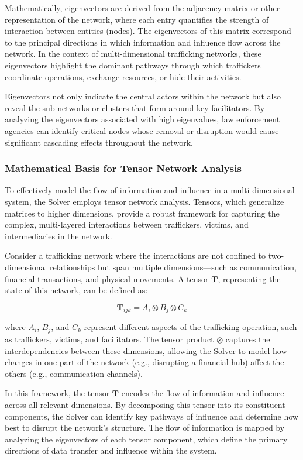 \documentclass[%
 preprint, linenumbers,
 amsmath,amssymb,
 aps, physrev,
]{revtex4-2}
\begin{document}
Mathematically, eigenvectors are derived from the adjacency matrix or other representation of the network, where each entry quantifies the strength of interaction between entities (nodes). The eigenvectors of this matrix correspond to the principal directions in which information and influence flow across the network. In the context of multi-dimensional trafficking networks, these eigenvectors highlight the dominant pathways through which traffickers coordinate operations, exchange resources, or hide their activities. 

Eigenvectors not only indicate the central actors within the network but also reveal the sub-networks or clusters that form around key facilitators. By analyzing the eigenvectors associated with high eigenvalues, law enforcement agencies can identify critical nodes whose removal or disruption would cause significant cascading effects throughout the network.

\subsubsection{Mathematical Basis for Tensor Network Analysis}

To effectively model the flow of information and influence in a multi-dimensional system, the Solver employs tensor network analysis. Tensors, which generalize matrices to higher dimensions, provide a robust framework for capturing the complex, multi-layered interactions between traffickers, victims, and intermediaries in the network. 

Consider a trafficking network where the interactions are not confined to two-dimensional relationships but span multiple dimensions—such as communication, financial transactions, and physical movements. A tensor \(\mathbf{T}\), representing the state of this network, can be defined as:

\[
\mathbf{T}_{ijk} = A_i \otimes B_j \otimes C_k
\]

where \(A_i\), \(B_j\), and \(C_k\) represent different aspects of the trafficking operation, such as traffickers, victims, and facilitators. The tensor product \(\otimes\) captures the interdependencies between these dimensions, allowing the Solver to model how changes in one part of the network (e.g., disrupting a financial hub) affect the others (e.g., communication channels).

In this framework, the tensor \(\mathbf{T}\) encodes the flow of information and influence across all relevant dimensions. By decomposing this tensor into its constituent components, the Solver can identify key pathways of influence and determine how best to disrupt the network’s structure. The flow of information is mapped by analyzing the eigenvectors of each tensor component, which define the primary directions of data transfer and influence within the system.
\end{document}
